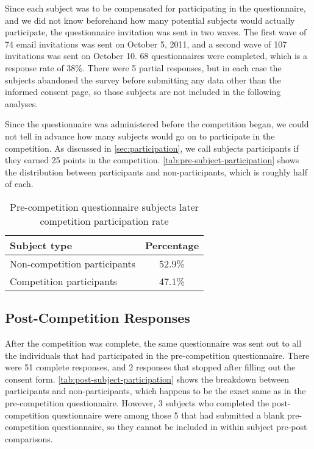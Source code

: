Since each subject was to be compensated for participating in the questionnaire, and we did not know beforehand how many potential subjects would actually participate, the questionnaire invitation was sent in two waves. The first wave of 74 email invitations was sent on October 5, 2011, and a second wave of 107 invitations was sent on October 10. 68 questionnaires were completed, which is a response rate of 38\%. There were 5 partial responses, but in each case the subjects abandoned the survey before submitting any data other than the informed consent page, so those subjects are not included in the following analyses.

Since the questionnaire was administered before the competition began, we could not tell in advance how many subjects would go on to participate in the competition. As discussed in \autoref{sec:participation}, we call subjects participants if they earned 25 points in the competition. \autoref{tab:pre-subject-participation} shows the distribution between participants and non-participants, which is roughly half of each.

\begin{table}[htbp]
	\centering
		\begin{tabular}{| l | c |}
			\hline
			Subject type & Percentage \tabularnewline \hline \hline
			Non-competition participants & 52.9\% \tabularnewline \hline
			Competition participants & 47.1\% \tabularnewline \hline
		\end{tabular}
	\caption{Pre-competition questionnaire subjects later competition participation rate}
\label{tab:pre-subject-participation}
\end{table}

\subsection{Post-Competition Responses}

After the competition was complete, the same questionnaire was sent out to all the individuals that had participated in the pre-competition questionnaire. There were 51 complete responses, and 2 responses that stopped after filling out the consent form. \autoref{tab:post-subject-participation} shows the breakdown between participants and non-participants, which happens to be the exact same as in the pre-competition questionnaire. However, 3 subjects who completed the post-competition questionnaire were among those 5 that had submitted a blank pre-competition questionnaire, so they cannot be included in within subject pre-post comparisons.

